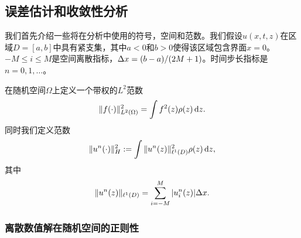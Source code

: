 \subsection{误差估计和收敛性分析}


我们首先介绍一些将在分析中使用的符号，空间和范数。我们假设$u(x,t,z)$在区域$D = [a, b]$中具有紧支集，其中$a <0$和$b>0 $使得该区域包含界面$x = 0$。$-M \leq i \leq M$是空间离散指标，$\Delta x =(b - a)/(2M + 1)$。时间步长指标是$n = 0,1,\dotsc$。

在随机空间$\Omega$上定义一个带权的$L^2$范数
\begin{equation}
  \|f(\cdot)\|^2_{L^2(\Omega)} = \int f^2(z)\rho(z)\mathop{}\!\mathrm{d} z.
\end{equation}
同时我们定义范数
\begin{equation}
  \|u^n(\cdot)\|_H^2 := \int\|u^n(z)\|_{\ell^1(D)}^2\rho(z)\mathop{}\!\mathrm{d} z,
\end{equation}
其中
\begin{equation}
  \|u^n(z)\|_{\ell^1(D)} = \sum_{i=-M}^M|u^n_i(z)|\Delta x.
\end{equation}


\subsubsection{离散数值解在随机空间的正则性}

